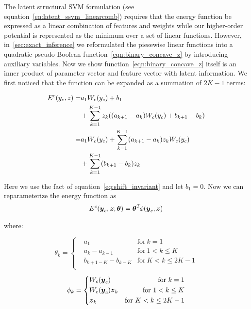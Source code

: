 \documentclass[sigconf, anonymous, review]{acmart}
\begin{document}
The latent structural SVM formulation (see
equation~\eqref{eq:latent_ssvm_linearcomb}) requires that the
energy function be expressed as a linear combination of features
and weights while our higher-order potential is represented as
the minimum over a set of linear functions. However,
in~\ref{sec:exact_inference} we reformulated the piesewise linear
functions into a quadratic pseudo-Boolean
function~\eqref{eqn:binary_concave_z} by introducing auxiliary
variables. Now we show function~\eqref{eqn:binary_concave_z}
itself is an inner product of parameter vector and feature vector
with latent information. We first noticed that the function can
be expanded as a summation of $2K-1$ terms:

\begin{align}
  \label{eq:originalenergy}
  E^c(y_c,z)=&a_1W_c(y_c)+b_1\notag \\
            &+\sum_{k=1}^{K-1}z_k((a_{k+1}-a_k)W_c(y_c)+b_{k+1}-b_k)\notag \\ 
            =&a_1W_c(y_c)+\sum_{k=1}^{K-1}(a_{k+1}-a_k)z_kW_c(y_c) \notag \\
            &+\sum_{k=1}^{K-1}(b_{k+1}-b_k)z_k
\end{align}

Here we use the fact of equation~\eqref{eq:shift_invariant} and
let $b_1=0$. Now we can reparameterize the energy function
as
\begin{align}
  \label{eq:llsvm_innerprod_energy}
  E^c({\boldsymbol{y}}_c,{\boldsymbol{z}}; \boldsymbol{\theta}) = \boldsymbol{\theta}^T \! \phi({\boldsymbol{y}}_c,{\boldsymbol{z}})
\end{align}

\noindent where:

\begin{equation}
\label{eq:llsvm_param}
  \theta_k = \left\{
    \begin{aligned}
      & a_1	& \text{for} \ k=1\\
      & a_k-a_{k-1} & \text{for}\ 1< k \leq K\\
      & b_{k+1-K}-b_{k-K} & \text{for} \ K<k\le2K-1\\
    \end{aligned}
  \right.
\end{equation}

\begin{equation}
\label{eq:llsvm_feature}
  \phi_k = \left\{
		\begin{aligned}
      & W_c({\boldsymbol{y}}_c) 	& \text{for} \ k=1\\
      & W_c({\boldsymbol{y}}_c){\boldsymbol{z}}_k & \text{for}\ 1<k\le K\\
      & {\boldsymbol{z}}_k & \text{for} \ K<k\le2K-1\\
		\end{aligned}
  \right.
\end{equation}
\end{document}
